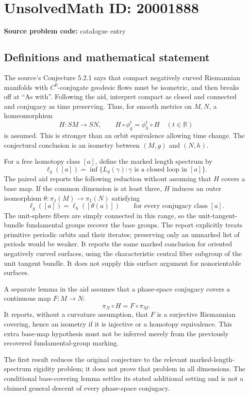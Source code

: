 \documentclass[11pt]{article}
\begin{document}
\section*{UnsolvedMath ID: 20001888}
\textbf{Source problem code:} catalogue entry
\subsection{Definitions and mathematical statement}
The source's Conjecture 5.2.1 says that compact negatively curved Riemannian manifolds with \(C^0\)-conjugate geodesic flows must be isometric, and then breaks off at ``As with''. Following the aid, interpret compact as closed and connected and conjugacy as time preserving. Thus, for smooth metrics on \(M,N\), a homeomorphism
\[
 H:SM\longrightarrow SN,\qquad
 H\circ\phi_g^t=\phi_h^t\circ H\quad(t\in\mathbb R)
\]
is assumed. This is stronger than an orbit equivalence allowing time change. The conjectural conclusion is an isometry between \((M,g)\) and \((N,h)\).

For a free homotopy class \([a]\), define the marked length spectrum by
\[
 \ell_g([a])=\inf\{L_g(\gamma):\gamma\text{ is a closed loop in }[a]\}.
\]
The paired aid reports the following reduction without assuming that \(H\) covers a base map. If the common dimension is at least three, \(H\) induces an outer isomorphism
\(\theta:\pi_1(M)\to\pi_1(N)\) satisfying
\[
 \ell_g([a])=\ell_h([\theta(a)])
 \qquad\text{for every conjugacy class }[a].
\]
The unit-sphere fibers are simply connected in this range, so the unit-tangent-bundle fundamental groups recover the base groups. The report explicitly treats primitive periodic orbits and their iterates; preserving only an unmarked list of periods would be weaker. It reports the same marked conclusion for oriented negatively curved surfaces, using the characteristic central fiber subgroup of the unit tangent bundle. It does not supply this surface argument for nonorientable surfaces.

A separate lemma in the aid assumes that a phase-space conjugacy covers a continuous map \(F:M\to N\):
\[
 \pi_N\circ H=F\circ\pi_M.
\]
It reports, without a curvature assumption, that \(F\) is a surjective Riemannian covering, hence an isometry if it is injective or a homotopy equivalence. This extra base-map hypothesis must not be inferred merely from the previously recovered fundamental-group marking.

The first result reduces the original conjecture to the relevant marked-length-spectrum rigidity problem; it does not prove that problem in all dimensions. The conditional base-covering lemma settles its stated additional setting and is not a claimed general descent of every phase-space conjugacy.
\end{document}
